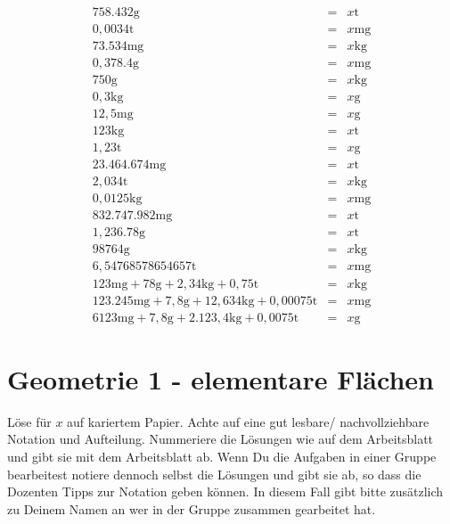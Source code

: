 \documentclass[a4paper]{book}%
\newcommand{\anweisungArbeitsblatt}{Löse für $x$ auf kariertem Papier. Achte auf eine gut lesbare/ nachvollziehbare Notation und Aufteilung. Nummeriere die Lösungen wie auf dem Arbeitsblatt und gibt sie mit dem Arbeitsblatt ab. Wenn Du die Aufgaben in einer Gruppe bearbeitest notiere dennoch selbst die Lösungen und gibt sie ab, so dass die Dozenten Tipps zur Notation geben können. In diesem Fall gibt bitte zusätzlich zu Deinem Namen an wer in der Gruppe zusammen gearbeitet hat.}
\theoremstyle{definition}
\begin{document}
\begin{eqnarray}
    758.432 \text{g} &=& x \text{t} \\
    0,0034 \text{t} &=& x \text{mg} \\
    73.534 \text{mg} &=& x \text{kg} \\
    0,378.4 \text{g} &=& x \text{mg} \\
    750 \text{g} &=& x \text{kg} \\
    0,3 \text{kg} &=& x \text{g} \\
    12,5 \text{mg} &=& x \text{g} \\
    123 \text{kg} &=& x \text{t} \\
    1,23 \text{t} &=& x \text{g} \\
    23.464.674 \text{mg} &=& x \text{t} \\
    2,034 \text{t} &=& x \text{kg} \\
    0,0125 \text{kg} &=& x \text{mg} \\
  832.747.982\text{mg} &=& x \text{t} \\
  1,236.78 \text{g} &=& x \text{t} \\
  98764\text{g} &=& x \text{kg} \\
  6,54768578654657\text{t} &=& x \text{mg} \\
  123 \text{mg} + 78 \text{g} + 2,34 \text{kg} + 0,75 \text{t} &=& x \text{kg} \\
  123.245 \text{mg} + 7,8 \text{g} + 12,634 \text{kg} + 0,00075 \text{t} &=& x \text{mg} \\
  6123 \text{mg} + 7,8 \text{g} + 2.123,4 \text{kg} + 0,0075 \text{t} &=& x \text{g}
\end{eqnarray}


\newpage
\section{Geometrie 1 - elementare Flächen}

\anweisungArbeitsblatt
\end{document}
